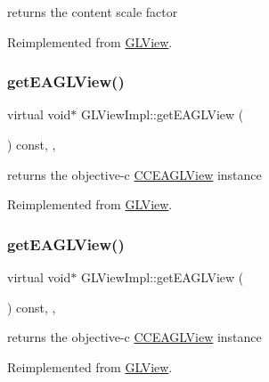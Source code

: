 returns the content scale factor 

Reimplemented from \hyperlink{classGLView_a730b2ced5ee33d2bf975eb3fffd317bf}{G\+L\+View}.

\mbox{\label{classGLViewImpl_aaddd8dc59db9a517edb63238f79e1c55}} 
\subsubsection{\texorpdfstring{get\+E\+A\+G\+L\+View()}{getEAGLView()}\hspace{0.1cm}{\footnotesize\ttfamily [1/2]}}
{\footnotesize\ttfamily virtual void$\ast$ G\+L\+View\+Impl\+::get\+E\+A\+G\+L\+View (\begin{DoxyParamCaption}{ }\end{DoxyParamCaption}) const\hspace{0.3cm}{\ttfamily [inline]}, {\ttfamily [override]}, {\ttfamily [virtual]}}

returns the objective-\/c \hyperlink{interfaceCCEAGLView}{C\+C\+E\+A\+G\+L\+View} instance 

Reimplemented from \hyperlink{classGLView}{G\+L\+View}.

\mbox{\label{classGLViewImpl_aaddd8dc59db9a517edb63238f79e1c55}} 
\subsubsection{\texorpdfstring{get\+E\+A\+G\+L\+View()}{getEAGLView()}\hspace{0.1cm}{\footnotesize\ttfamily [2/2]}}
{\footnotesize\ttfamily virtual void$\ast$ G\+L\+View\+Impl\+::get\+E\+A\+G\+L\+View (\begin{DoxyParamCaption}{ }\end{DoxyParamCaption}) const\hspace{0.3cm}{\ttfamily [inline]}, {\ttfamily [override]}, {\ttfamily [virtual]}}

returns the objective-\/c \hyperlink{interfaceCCEAGLView}{C\+C\+E\+A\+G\+L\+View} instance 

Reimplemented from \hyperlink{classGLView}{G\+L\+View}.

